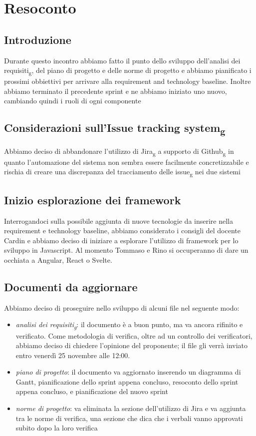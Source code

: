 \section{Resoconto}
\subsection{Introduzione}
Durante questo incontro abbiamo fatto il punto dello sviluppo dell'analisi dei requisiti\textsubscript{g}, del piano di progetto e delle norme di progetto e abbiamo pianificato i prossimi obbiettivi per arrivare alla requirement and technology baseline. Inoltre abbiamo terminato il precedente sprint e ne abbiamo iniziato uno nuovo, cambiando quindi i ruoli di ogni componente

\subsection{Considerazioni sull'Issue tracking system\textsubscript{g}}
Abbiamo deciso di abbandonare l'utilizzo di Jira\textsubscript{g} a supporto di Github\textsubscript{g} in quanto l'automazione del sistema non sembra essere facilmente concretizzabile e rischia di creare una discrepanza del tracciamento delle issue\textsubscript{g} nei due sistemi

\subsection{Inizio esplorazione dei framework}
Interrogandoci sulla possibile aggiunta di nuove tecnologie da inserire nella requirement e technology baseline, abbiamo considerato i consigli del docente Cardin e abbiamo deciso di iniziare a esplorare l'utilizzo di framework per lo sviluppo in Javascript. Al momento Tommaso e Rino si occuperanno di dare un occhiata a Angular, React o Svelte.


\subsection{Documenti da aggiornare}
Abbiamo deciso di proseguire nello sviluppo di alcuni file nel seguente modo:
\begin{itemize}
	\item \textit{analisi dei requisiti\textsubscript{g}}: il documento è a buon punto, ma va ancora rifinito e verificato. Come metodologia di verifica, oltre ad un controllo dei verificatori, abbiamo deciso di chiedere l'opinione del proponente; il file gli verrà inviato entro venerdì 25 novembre alle 12:00.
	\item \textit{piano di progetto}: il documento va aggiornato inserendo un diagramma di Gantt, pianificazione dello sprint appena concluso, resoconto dello sprint appena concluso, e pianificazione del nuovo sprint
	\item \textit{norme di progetto}: va eliminata la sezione dell'utilizzo di Jira e va aggiunta tra le norme di verifica, una sezione che dica che i verbali vanno approvati subito dopo la loro verifica
\end{itemize}


